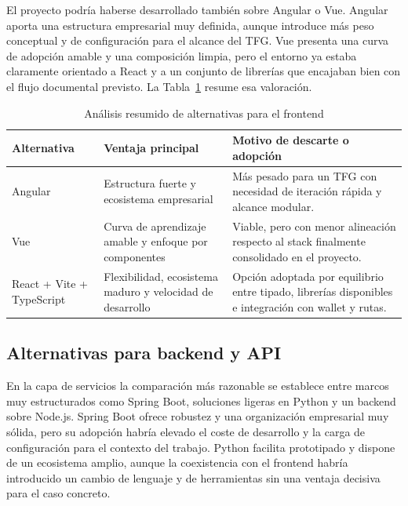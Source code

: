 \documentclass[11pt, a4paper]{article}
\begin{document}
El proyecto podría haberse desarrollado también sobre Angular o Vue. Angular aporta una estructura empresarial muy definida, aunque introduce más peso conceptual y de configuración para el alcance del TFG. Vue presenta una curva de adopción amable y una composición limpia, pero el entorno ya estaba claramente orientado a React y a un conjunto de librerías que encajaban bien con el flujo documental previsto. La Tabla~\ref{tab:alternativas-frontend} resume esa valoración.

\begin{table}[H]
    \centering
    \small
    \begin{tabular}{|p{2.7cm}|p{3.4cm}|p{6.8cm}|}
    \hline
    \textbf{Alternativa} & \textbf{Ventaja principal} & \textbf{Motivo de descarte o adopción} \\
    \hline
    Angular & Estructura fuerte y ecosistema empresarial & Más pesado para un TFG con necesidad de iteración rápida y alcance modular. \\
    \hline
    Vue & Curva de aprendizaje amable y enfoque por componentes & Viable, pero con menor alineación respecto al stack finalmente consolidado en el proyecto. \\
    \hline
    React + Vite + TypeScript & Flexibilidad, ecosistema maduro y velocidad de desarrollo & Opción adoptada por equilibrio entre tipado, librerías disponibles e integración con wallet y rutas. \\
    \hline
    \end{tabular}
    \caption{Análisis resumido de alternativas para el frontend}
    \label{tab:alternativas-frontend}
\end{table}

\subsection{Alternativas para backend y API}

En la capa de servicios la comparación más razonable se establece entre marcos muy estructurados como Spring Boot, soluciones ligeras en Python y un backend sobre Node.js. Spring Boot ofrece robustez y una organización empresarial muy sólida, pero su adopción habría elevado el coste de desarrollo y la carga de configuración para el contexto del trabajo. Python facilita prototipado y dispone de un ecosistema amplio, aunque la coexistencia con el frontend habría introducido un cambio de lenguaje y de herramientas sin una ventaja decisiva para el caso concreto.
\end{document}
